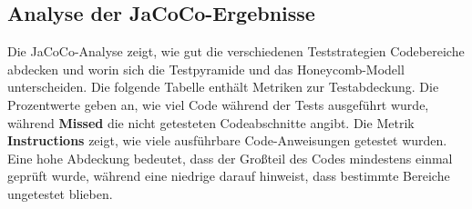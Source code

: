 \subsection{Analyse der JaCoCo-Ergebnisse}
Die JaCoCo-Analyse zeigt, wie gut die verschiedenen Teststrategien Codebereiche abdecken und worin sich die Testpyramide und das Honeycomb-Modell unterscheiden. Die folgende Tabelle enthält Metriken zur Testabdeckung. Die Prozentwerte geben an, wie viel Code während der Tests ausgeführt wurde, während \textbf{Missed} die nicht getesteten Codeabschnitte angibt. Die Metrik \textbf{Instructions} zeigt, wie viele ausführbare Code-Anweisungen getestet wurden. Eine hohe Abdeckung bedeutet, dass der Großteil des Codes mindestens einmal geprüft wurde, während eine niedrige darauf hinweist, dass bestimmte Bereiche ungetestet blieben.

